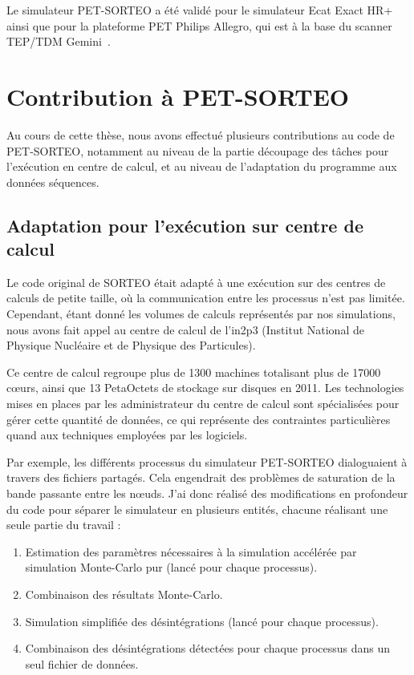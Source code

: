 Le simulateur PET-SORTEO a été validé pour le simulateur Ecat Exact HR+~\cite{reilhac2004pet} ainsi que pour la plateforme PET Philips Allegro, qui est à la base du scanner TEP/TDM Gemini~\cite{lemaitre2008}. 


	\section{Contribution à PET-SORTEO}

Au cours de cette thèse, nous avons effectué plusieurs contributions au code de PET-SORTEO, notamment au niveau de la partie découpage des tâches pour l'exécution en centre de calcul, et au niveau de l'adaptation du programme aux données séquences.

\subsection{Adaptation pour l'exécution sur centre de calcul}

Le code original de SORTEO était adapté à une exécution sur des centres de calculs de petite taille, où la communication entre les processus n’est pas limitée. Cependant, étant donné les volumes de calculs représentés par nos simulations, nous avons fait appel au centre de calcul de l'in2p3 (Institut National de Physique Nucléaire et de Physique des Particules).

Ce centre de calcul regroupe plus de 1300 machines totalisant plus de 17000 cœurs, ainsi que 13 PetaOctets de stockage sur disques en 2011. Les technologies mises en places par les administrateur du centre de calcul sont spécialisées pour gérer cette quantité de données, ce qui représente des contraintes particulières quand aux techniques employées par les logiciels.

Par exemple, les différents processus du simulateur PET-SORTEO dialoguaient à travers des fichiers partagés. Cela engendrait des problèmes de saturation de la bande passante entre les nœuds. J'ai donc réalisé des modifications en profondeur du code pour séparer le simulateur en plusieurs entités, chacune réalisant une seule partie du travail :

    \begin{enumerate}
        \item Estimation des paramètres nécessaires à la simulation accélérée par simulation Monte-Carlo pur (lancé pour chaque processus).
        \item Combinaison des résultats Monte-Carlo.
        \item Simulation simplifiée des désintégrations (lancé pour chaque processus).
        \item Combinaison des désintégrations détectées pour chaque processus dans un seul fichier de données.
    \end{enumerate}

